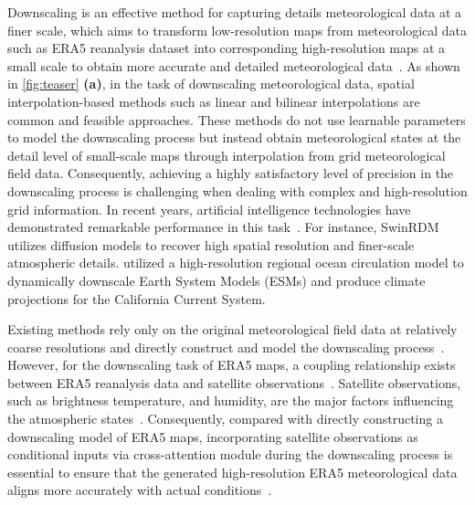 Downscaling is an effective method for capturing details meteorological data at a finer scale, which aims to transform low-resolution maps from meteorological data such as ERA5 reanalysis dataset into corresponding high-resolution maps at a small scale to obtain more accurate and detailed meteorological data~\cite{fang2013spatial, de2018estimating, aich2024conditional}. 
As shown in \cref{fig:teaser} \textbf{(a)}, in the task of downscaling meteorological data, spatial interpolation-based methods such as linear and bilinear interpolations are common and feasible approaches. 
These methods do not use learnable parameters to model the downscaling process but instead obtain meteorological states at the detail level of small-scale maps through interpolation from grid meteorological field data. 
Consequently, achieving a highly satisfactory level of precision in the downscaling process is challenging when dealing with complex and high-resolution grid information. 
In recent years, artificial intelligence technologies have demonstrated remarkable performance in this task~\cite{sun2024deep,wang2021method}. 
For instance, SwinRDM~\cite{chen2023swinrdm} utilizes diffusion models to recover high spatial resolution and finer-scale atmospheric details. 
\cite{pozo2021dynamically} utilized a high-resolution regional ocean circulation model to dynamically downscale Earth System Models (ESMs) and produce climate projections for the California Current System. 

Existing methods rely only on the original meteorological field data at relatively coarse resolutions and directly construct and model the downscaling process~\cite{hess2024fast, zhu2024downscaling}. 
However, for the downscaling task of ERA5 maps, a coupling relationship exists between ERA5 reanalysis data and satellite observations~\cite{vaughan2024aardvark,vandal2024global}. 
Satellite observations, such as brightness temperature, and humidity, are the major factors influencing the atmospheric states~\cite{mcnally2024data}. 
Consequently, compared with directly constructing a downscaling model of ERA5 maps, incorporating satellite observations as conditional inputs via cross-attention module during the downscaling process is essential to ensure that the generated high-resolution ERA5 meteorological data aligns more accurately with actual conditions~\cite{huang2019ccnet, feng2022training, qi2023fatezero}. 



